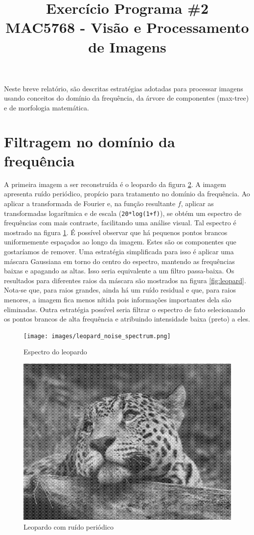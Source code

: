 \documentclass{article}
\title{Exercício Programa \#2\\MAC5768 - Visão e Processamento de Imagens}
\date{}
\begin{document}
\maketitle

Neste breve relatório, são descritas estratégias adotadas para processar imagens usando conceitos do domínio da frequência, da árvore de componentes (max-tree) e de morfologia matemática.

\section{Filtragem no domínio da frequência}
A primeira imagem a ser reconstruída é o leopardo da figura \ref{fig:leopard0}. A imagem apresenta ruído periódico, propício para tratamento no domínio da frequência. Ao aplicar a transformada de Fourier e, na função resultante $f$, aplicar as transformadas logarítmica e de escala (\texttt{20*log(1+f)}), se obtém um espectro de frequências com mais contraste, facilitando uma análise visual. Tal espectro é mostrado na figura \ref{fig:spectrum0}. É possível observar que há pequenos pontos brancos uniformemente espaçados ao longo da imagem. Estes são os componentes que gostaríamos de remover. Uma estratégia simplificada para isso é aplicar uma máscara Gaussiana em torno do centro do espectro, mantendo as frequências baixas e apagando as altas. Isso seria equivalente a um filtro passa-baixa. Os resultados para diferentes raios da máscara são mostrados na figura \ref{fig:leopard}. Nota-se que, para raios grandes, ainda há um ruído residual e que, para raios menores, a imagem fica menos nítida pois informações importantes dela são eliminadas. Outra estratégia possível seria filtrar o espectro de fato selecionando os pontos brancos de alta frequência e atribuindo intensidade baixa (preto) a eles.


\begin{figure}[H]
	\centering
	\texttt{[image: images/leopard\_noise\_spectrum.png]}
	\caption{Espectro do leopardo}
	\label{fig:spectrum0}
\end{figure}

\begin{figure}[H]
	\centering
	\includegraphics[width=.8\linewidth]{images/leopard_noise.png}
	\caption{Leopardo com ruído periódico}
	\label{fig:leopard0}
\end{figure}
\end{document}
